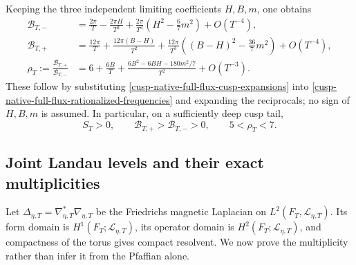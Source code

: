 Keeping the three independent limiting coefficients \(H,B,m\), one obtains
\begin{align}
 \mathcal B_{T,-}
 &=\frac{2\pi}{T}-\frac{2\pi H}{T^2}
 +\frac{2\pi}{T^3}\left(H^2-\frac67m^2\right)+O(T^{-4}),
 \label{cusp-native-full-flux-Bminus-expansion}\\
 \mathcal B_{T,+}
 &=\frac{12\pi}{T}+\frac{12\pi(B-H)}{T^2}
 +\frac{12\pi}{T^3}
 \left((B-H)^2-\frac{36}{7}m^2\right)+O(T^{-4}),
 \label{cusp-native-full-flux-Bplus-expansion}\\
 \rho_T:=\frac{\mathcal B_{T,+}}{\mathcal B_{T,-}}
 &=6+\frac{6B}{T}
 +\frac{6B^2-6BH-180m^2/7}{T^2}+O(T^{-3}).
 \label{cusp-native-full-flux-ratio-expansion}
\end{align}
These follow by substituting \cref{cusp-native-full-flux-cusp-expansions}
into \cref{cusp-native-full-flux-rationalized-frequencies} and expanding the
reciprocals; no sign of \(H,B,m\) is assumed.  In particular, on a sufficiently
deep cusp tail,
\begin{equation}
 S_T>0,
 \qquad \mathcal B_{T,+}>\mathcal B_{T,-}>0,
 \qquad 5<\rho_T<7.
 \label{cusp-native-full-flux-deep-tail-window}
\end{equation}

\subsection{Joint Landau levels and their exact multiplicities}

Let \(\Delta_{\eta,T}=\nabla_{\eta,T}^*\nabla_{\eta,T}\) be the Friedrichs
magnetic Laplacian on \(L^2(F_T,\mathscr L_{\eta,T})\).  Its form domain is
\(H^1(F_T;\mathscr L_{\eta,T})\), its operator domain is
\(H^2(F_T;\mathscr L_{\eta,T})\), and compactness of the torus gives compact
resolvent.  We now prove the multiplicity rather than infer it from the
Pfaffian alone.

